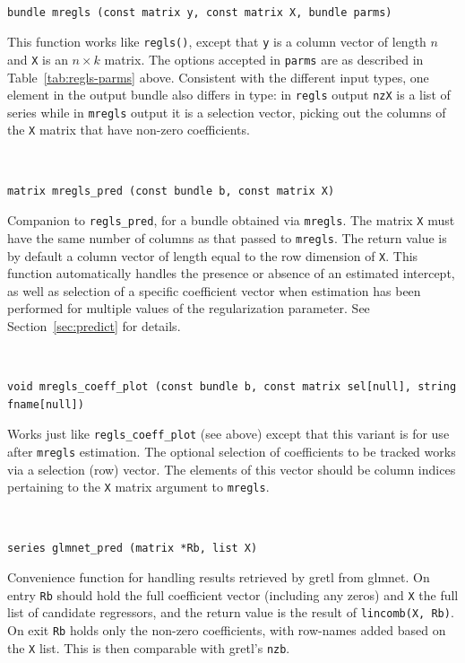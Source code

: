 \documentclass{article}
\newenvironment{funcdoc}
{\noindent\hrulefill\\[-12pt]}
{\medbreak}
\begin{document}
\begin{funcdoc}
\begin{verbatim}
bundle mregls (const matrix y, const matrix X, bundle parms)
\end{verbatim}
  This function works like \texttt{regls()}, except that \texttt{y} is
  a column vector of length $n$ and \texttt{X} is an $n \times k$
  matrix. The options accepted in \texttt{parms} are as described in
  Table~\ref{tab:regls-parms} above. Consistent with the different
  input types, one element in the output bundle also differs in type:
  in \texttt{regls} output \texttt{nzX} is a list of series while in
  \texttt{mregls} output it is a selection vector, picking out the
  columns of the \texttt{X} matrix that have non-zero coefficients.
\end{funcdoc}

\begin{funcdoc}
\begin{verbatim}
matrix mregls_pred (const bundle b, const matrix X)
\end{verbatim}
  Companion to \texttt{regls\_pred}, for a bundle obtained via
  \texttt{mregls}. The matrix \texttt{X} must have the same number of
  columns as that passed to \texttt{mregls}. The return value is by
  default a column vector of length equal to the row dimension of
  \texttt{X}.  This function automatically handles the presence or
  absence of an estimated intercept, as well as selection of a
  specific coefficient vector when estimation has been performed for
  multiple values of the regularization parameter. See
  Section~\ref{sec:predict} for details.
\end{funcdoc}

\begin{funcdoc}
\begin{verbatim}
void mregls_coeff_plot (const bundle b, const matrix sel[null], string fname[null])
\end{verbatim}
  Works just like \texttt{regls\_coeff\_plot} (see above) except that
  this variant is for use after \texttt{mregls} estimation. The
  optional selection of coefficients to be tracked works via a
  selection (row) vector. The elements of this vector should be column
  indices pertaining to the \texttt{X} matrix argument to
  \texttt{mregls}.
\end{funcdoc}

\begin{funcdoc}
\begin{verbatim}
series glmnet_pred (matrix *Rb, list X)
\end{verbatim}
  Convenience function for handling results retrieved by gretl from
  \textsf{glmnet}. On entry \texttt{Rb} should hold the full
  coefficient vector (including any zeros) and \texttt{X} the full
  list of candidate regressors, and the return value is the result of
  \texttt{lincomb(X, Rb)}. On exit \texttt{Rb} holds only the non-zero
  coefficients, with row-names added based on the \texttt{X}
  list. This is then comparable with gretl's \texttt{nzb}.
\end{funcdoc}
\end{document}
